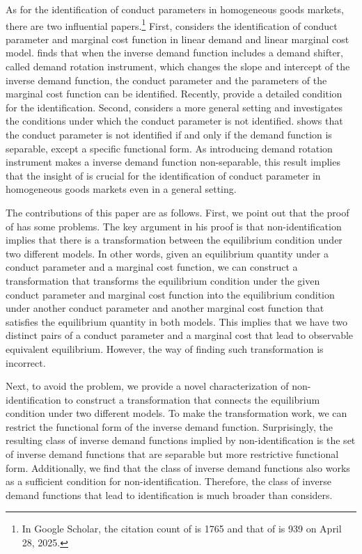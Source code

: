 \documentclass[11pt, a4paper]{article}
\theoremstyle{remark}
\begin{document}
As for the identification of conduct parameters in homogeneous goods markets, there are two influential papers.\footnote{In Google Scholar, the citation count of \citet{bresnahan1982oligopoly} is 1765 and that of \citet{lau1982identifying} is 939 on April 28, 2025.}
First, \citet{bresnahan1982oligopoly} considers the identification of conduct parameter and marginal cost function in linear demand and linear marginal cost model.
\citet{bresnahan1982oligopoly} finds that when the inverse demand function includes a demand shifter, called demand rotation instrument, which changes the slope and intercept of the inverse demand function, the conduct parameter and the parameters of the marginal cost function can be identified.
Recently, \citet{matsumura2023resolving} provide a detailed condition for the identification.
Second, \citet{lau1982identifying} considers a more general setting and investigates the conditions under which the conduct parameter is not identified.
\citet{lau1982identifying} shows that the conduct parameter is not identified if and only if the demand function is separable, except a specific functional form.
As introducing demand rotation instrument makes a inverse demand function non-separable, this result implies that the insight of \citet{bresnahan1982oligopoly} is crucial for the identification of conduct parameter in homogeneous goods markets even in a general setting.


The contributions of this paper are as follows. 
First, we point out that the proof of \citet{lau1982identifying} has some problems.
The key argument in his proof is that non-identification implies that there is a transformation between the equilibrium condition under two different models.
In other words, given an equilibrium quantity under a conduct parameter and a marginal cost function, we can construct a transformation that transforms the equilibrium condition under the given conduct parameter and marginal cost function into the equilibrium condition under another conduct parameter and another marginal cost function that satisfies the equilibrium quantity in both models.
This implies that we have two distinct pairs of a conduct parameter and a marginal cost that lead to observable equivalent equilibrium.
However, the way of finding such transformation is incorrect.

Next, to avoid the problem, we provide a novel characterization of non-identification to construct a transformation that connects the equilibrium condition under two different models.
To make the transformation work, we can restrict the functional form of the inverse demand function.
Surprisingly, the resulting class of inverse demand functions implied by non-identification is the set of inverse demand functions that are separable but more restrictive functional form.
Additionally, we find that the class of inverse demand functions also works as a sufficient condition for non-identification.
Therefore, the class of inverse demand functions that lead to identification is much broader than \citet{lau1982identifying} considers.
\end{document}
